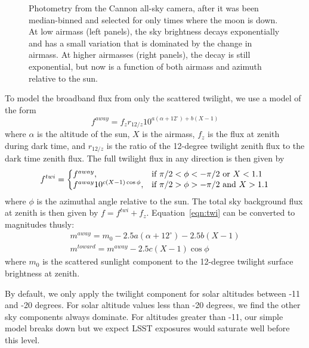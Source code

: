 \documentclass{emulateapj}  %
\begin{document}
\begin{figure*}
  \caption{Photometry from the Cannon all-sky camera, after it was been median-binned and selected for only times where the moon is down.  At low airmass (left panels), the sky brightness decays exponentially and has a small variation that is dominated by the change in airmass.  At higher airmasses (right panels), the decay is still exponential, but now is a function of both airmass and azimuth relative to the sun. \label{fig:twiExp}}
\end{figure*}



To model the broadband flux from only the scattered twilight, we use a model of the form
\begin{equation}\label{eqn:twi1}
  f^{away} = f_{z} r_{12/z} 10^{a(\alpha+12^{\circ})+b(X-1)}
\end{equation}
where $\alpha$ is the altitude of the sun, $X$ is the airmass, $f_{z}$ is the flux at zenith during dark time, and $r_{12/z}$ is the ratio of the 12-degree twilight zenith flux to the dark time zenith flux. The full twilight flux in any direction is then given by
\begin{equation}
  \label{eqn:twi}
  f^{twi}  = \left\{
  \begin{array}{@{}ll@{}}
        f^{away}, & \text{if}\  \pi/2 < \phi < -\pi/2  \text{ or } X < 1.1\\
        f^{away} 10^{c (X-1) \cos{\phi}}, &  \text{if}\   \pi/2 > \phi >  -\pi/2 \text{ and } X > 1.1
        \end{array} \right.
\end{equation}
where $\phi$ is the azimuthal angle relative to the sun. The total sky background flux at zenith is then given by $f = f^{twi} + f_{z}$. Equation~\ref{eqn:twi} can be converted to magnitudes thusly:
\begin{eqnarray}
  m^{away} = m_0 -2.5a(\alpha+12^{\circ})-2.5b(X-1) \\
  m^{toward} = m^{away} -2.5c(X-1)\cos{\phi}
\end{eqnarray}
where $m_0$ is the scattered sunlight component to the 12-degree twilight surface brightness at zenith.  

By default, we only apply the twilight component for solar altitudes between -11 and -20 degrees. For solar altitude values less than -20 degrees, we find the other sky components always dominate. For altitudes greater than -11, our simple model breaks down but we expect LSST exposures would saturate well before this level.  
\end{document}
